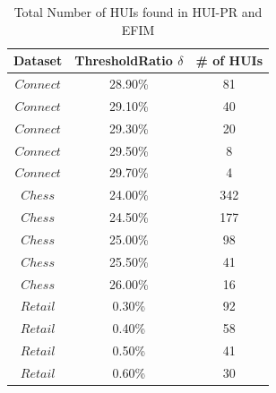 \documentclass[11pt,openright]{report}
\begin{document}
\begin{table}
	\renewcommand{\arraystretch}{1.3}
	\caption{Total Number of HUIs found in HUI-PR and EFIM}
	\label{table:result_huis}
	\centering
	\begin{tabular}{|c||c|c|}
		\hline
		\bfseries Dataset & \bfseries ThresholdRatio $\delta$ & \bfseries \# of HUIs\\
		\hline\hline
		$Connect$ & 28.90\% & 81\\ \hline
		$Connect$ & 29.10\% & 40\\ \hline
		$Connect$ & 29.30\% & 20\\ \hline
		$Connect$ & 29.50\% & 8\\ \hline
		$Connect$ & 29.70\% & 4\\ \hline \hline
		
		$Chess$ & 24.00\% & 342\\ \hline
		$Chess$ & 24.50\% & 177\\ \hline
		$Chess$ & 25.00\% & 98\\ \hline
		$Chess$ & 25.50\% & 41\\ \hline
		$Chess$ & 26.00\% & 16\\ \hline \hline
		
		$Retail$ & 0.30\% & 92\\ \hline
		$Retail$ & 0.40\% & 58\\ \hline
		$Retail$ & 0.50\% & 41\\ \hline
		$Retail$ & 0.60\% & 30\\ \hline
		
	\end{tabular}
\end{table}
\end{document}
